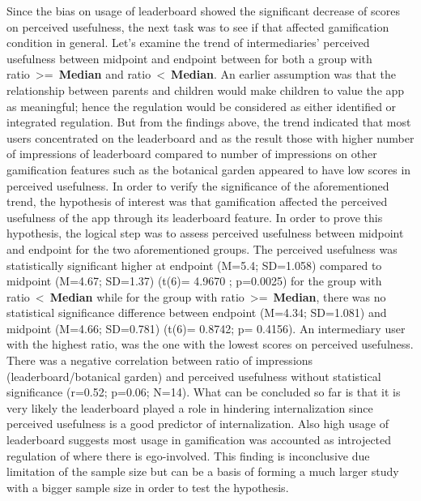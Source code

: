 Since the bias on usage of leaderboard showed the significant decrease of scores on perceived usefulness, the next task was to see if that affected gamification condition in general. Let's examine the trend of intermediaries' perceived usefulness between midpoint and endpoint between for both a group with ratio~\textgreater=~\textbf{Median} and ratio~\textless~\textbf{Median}. An earlier assumption was that the relationship between parents and children would make children to value the app as meaningful; hence the regulation would be considered as either identified or integrated regulation. But from the findings above, the trend indicated that most users concentrated on the leaderboard and as the result those with higher number of impressions of leaderboard compared to number of impressions on other gamification features such as the botanical garden appeared to have low scores in perceived usefulness. In order to verify the significance of the aforementioned trend,  the hypothesis of interest was that gamification affected the perceived usefulness of the app through its leaderboard feature. In order to prove this hypothesis, the logical step was to assess perceived usefulness between midpoint and endpoint for the two aforementioned groups. The perceived usefulness was statistically significant higher at endpoint (M=5.4; SD=1.058) compared to midpoint (M=4.67; SD=1.37) (t(6)= 4.9670 ; p=0.0025) for the group with ratio~\textless~\textbf{Median} while for the group with ratio~\textgreater=~\textbf{Median}, there was no statistical significance difference between endpoint (M=4.34; SD=1.081) and midpoint (M=4.66; SD=0.781) (t(6)= 0.8742; p= 0.4156). An intermediary user with the highest ratio, was the one with the lowest scores on perceived usefulness. There was a negative correlation between ratio of impressions (leaderboard/botanical garden) and perceived usefulness without statistical significance (r=0.52; p=0.06; N=14). What can be concluded so far is that it is very likely the leaderboard played a role in hindering internalization since perceived usefulness is a good predictor of internalization.  Also high usage of leaderboard suggests most usage in gamification was accounted as introjected regulation of where there is ego-involved. This finding is inconclusive due limitation of the sample size but can be a basis of forming a much larger study with a bigger sample size in order to test the hypothesis.

